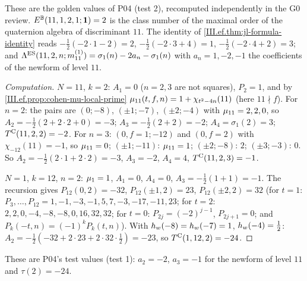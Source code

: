 \noindent These are the golden values of P04 (test 2), recomputed independently in the G0 review. $E^{\mathbb{B}}(11,1,2,1;\mathbf 1)=2$ is the class number of
the maximal order of the quaternion algebra of discriminant $11$. The identity of \cref{III.ef.thm:jl-formula-identity} reads
$-\frac12(-2\cdot1-2)=2$, $-\frac12(-2\cdot3+4)=1$, $-\frac12(-2\cdot4+2)=3$; and $\Lambda^{\mathrm{ES}}(11,2,n;m^{(1)}_{11})=\sigma_1(n)-2a_n-\sigma_1(n)$ with
$a_n=1,-2,-1$ the coefficients of the newform of level $11$.

\begin{example}
\end{example}
\begin{proof}[Computation]
$N=11$, $k=2$: $A_1=0$ ($n=2,3$ are not squares), $P_2=1$, and by \cref{III.ef.prop:cohen-mu-local-prime} $\mu_{11}(t,f,n)=1+\chi_{t^2-4n}(11)$ (here
$11\nmid f$). For $n=2$: the pairs are $(0;-8)$, $(\pm1;-7)$, $(\pm2;-4)$ with $\mu_{11}=2,2,0$, so $A_2=-\frac12(2+2\cdot2+0)=-3$; $A_3=-\frac12(2+2)=-2$;
$A_4=\sigma_1(2)=3$; $T^{\mathrm{C}}(11,2,2)=-2$. For $n=3$: $(0,f{=}1;-12)$ and $(0,f{=}2)$ with $\chi_{-12}(11)=-1$, so $\mu_{11}=0$; $(\pm1;-11)$:
$\mu_{11}=1$; $(\pm2;-8)$: $2$; $(\pm3;-3)$: $0$. So $A_2=-\frac12(2\cdot1+2\cdot2)=-3$, $A_3=-2$, $A_4=4$, $T^{\mathrm{C}}(11,2,3)=-1$.

$N=1$, $k=12$, $n=2$: $\mu_1=1$, $A_1=0$, $A_4=0$, $A_3=-\frac12(1+1)=-1$. The recursion gives $P_{12}(0,2)=-32$, $P_{12}(\pm1,2)=23$,
$P_{12}(\pm2,2)=32$ (for $t=1$: $P_3,\dots,P_{12}=1,-1,-3,-1,5,7,-3,-17,-11,23$; for $t=2$: $2,2,0,-4,-8,-8,0,16,32,32$; for $t=0$: $P_{2j}=(-2)^{j-1}$,
$P_{2j+1}=0$; and $P_k(-t,n)=(-1)^kP_k(t,n)$). With $h_w(-8)=h_w(-7)=1$, $h_w(-4)=\frac12$:
$A_2=-\frac12(-32+2\cdot23+2\cdot32\cdot\frac12)=-23$, so $T^{\mathrm{C}}(1,12,2)=-24$.
\end{proof}
\noindent These are P04's test values (test 1): $a_2=-2$, $a_3=-1$ for the newform of level $11$ and $\tau(2)=-24$.

